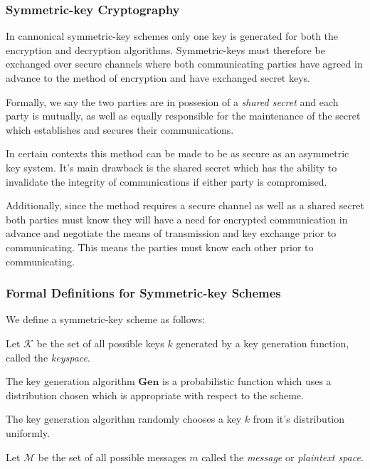 \subsubsection*{Symmetric-key Cryptography} 

In cannonical symmetric-key schemes only one key is generated for both the encryption and decryption algorithms. Symmetric-keys must therefore be exchanged over secure channels where both communicating parties have agreed in advance to the method of encryption and have exchanged secret keys. 


Formally, we say the two parties are in possesion of a \textit{shared secret} and each party is mutually, as well as equally responsible for the maintenance of the secret which establishes and secures their communications. 

 In certain contexts this method can be made to be as secure as an asymmetric key system. It's main drawback is the shared secret which has the ability to invalidate the integrity of communications if either party is compromised.


Additionally, since the method requires a secure channel as well as a shared secret both parties must know they will have a need for encrypted communication in advance and negotiate the means of transmission and key exchange prior to communicating. This means the parties must know each other prior to communicating. 



\subsubsection*{Formal Definitions for Symmetric-key Schemes}


We define a symmetric-key scheme as follows:


Let $\mathbf{\mathcal{K}}$ be the set of all possible keys $k$  generated by a key generation function, called the \textit{keyspace}.

The key generation algorithm $\mathbf{Gen}$ is a probabilistic function which uses a distribution chosen which is appropriate with respect to the scheme.

The key generation algorithm randomly chooses a key $k$ from it's distribution uniformly. 


Let $\mathbf{\mathcal{M}}$ be the set of all possible messages $m$ called the \textit{message} or \textit{{plaintext space}}.



